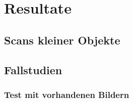 \chapter{Resultate}

	\section{Scans kleiner Objekte}
	
	\section{Fallstudien}\label{res:fall}
	
		\subsection{Test mit vorhandenen Bildern} \label{res:test_vorhandene_bilder}